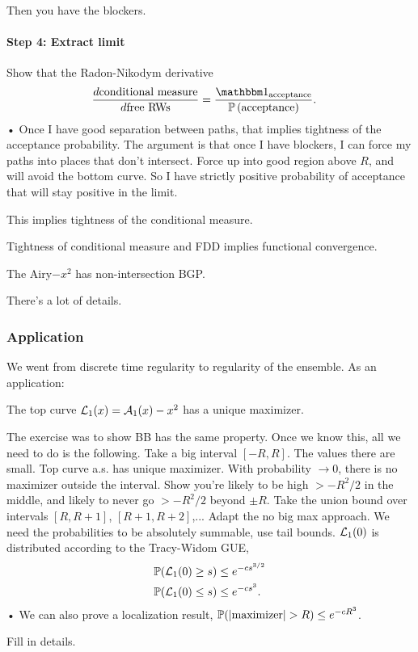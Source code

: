 Then you have the blockers.

\paragraph{Step 4: Extract limit}
Show that the Radon-Nikodym derivative
\begin{align*}
\dd{\text{conditional measure}}{\text{free RWs}} &= \fc{\one_{\text{acceptance}}}{\Pj\pat{acceptance}}.
\end{align*}•
Once I have good separation between paths, that implies tightness of the acceptance probability.
The argument is that once I have blockers, I can force my paths into places that don't intersect.
Force up into good region above $R$, and will avoid the bottom curve. So I have strictly positive probability of acceptance that will stay positive in the limit.

This implies tightness of the conditional measure. 

Tightness of conditional measure and FDD implies functional convergence.

The Airy$-x^2$ has non-intersection BGP.

There's a lot of details.

\subsubsection{Application}
We went from discrete time regularity to regularity of the ensemble.
As an application:
\begin{thm}
The top curve %
$\mathcal{L}_1(x) = \mathcal{A}_1(x)-x^2$ has a unique maximizer.
\end{thm}
The exercise was to show BB has the same property.  Once we know this, all we need to do is the following.
Take a big interval $[-R,R]$. The values there are small. 
Top curve a.s. has unique maximizer. With probability $\to0$, there is no maximizer outside the interval. 
Show you're likely to be high $>-R^2/2$ in the middle, and likely to never go $>-R^2/2$ beyond $\pm R$. 
Take the union bound over intervals $[R,R+1]$, $[R+1,R+2]$,... 
Adapt the no big max approach. We need the probabilities to be absolutely summable, use tail bounds. $\mathcal{L}_1(0)$ is distributed according to the Tracy-Widom GUE, 
\begin{align*}
\mathbb{P}(\mathcal{L}_1(0)\ge s) &\le e^{-cs^{3/2}}\\
\mathbb{P}(\mathcal{L}_1(0)\le s) &\le e^{-cs^3}.
\end{align*}•
We can also prove a localization result, $\Pj(|\text{maximizer}|>R) \le e^{-cR^3}$.
\begin{exr}
Fill in details.
\end{exr}

